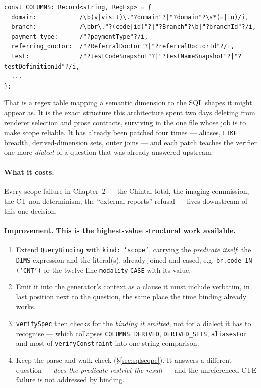 \documentclass[11pt,a4paper]{report}
\newcommand{\code}[1]{\texttt{\small #1}}
\begin{document}
\begin{lstlisting}
const COLUMNS: Record<string, RegExp> = {
  domain:            /\b(v|visit)\."?domain"?|"?domain"?\s*(=|in)/i,
  branch:            /\bbr\."?(code|id)"?|"?Branch"?\b|"?branchId"?/i,
  payment_type:      /"?paymentType"?/i,
  referring_doctor:  /"?ReferralDoctor"?|"?referralDoctorId"?/i,
  test:              /"?testCodeSnapshot"?|"?testNameSnapshot"?|"?testDefinitionId"?/i,
  ...
};
\end{lstlisting}

\noindent That is a regex table mapping a semantic dimension to the SQL shapes it might appear as.
It is the exact structure this architecture spent two days deleting from renderer selection and
prose contracts, surviving in the one file whose job is to make scope reliable. It has already been
patched four times --- aliases, \code{LIKE} breadth, derived-dimension sets, outer joins --- and
each patch teaches the verifier one more \emph{dialect} of a question that was already answered
upstream.

\paragraph{What it costs.} Every scope failure in Chapter~2 --- the Chintal total, the imaging
commission, the CT non-determinism, the ``external reports'' refusal --- lives downstream of this
one decision.

\paragraph{Improvement. This is the highest-value structural work available.}
\begin{enumerate}[leftmargin=*,itemsep=1pt]
\item Extend \code{QueryBinding} with \code{kind: 'scope'}, carrying the \emph{predicate itself}:
      the \code{DIMS} expression and the literal(s), already joined-and-cased, e.g.
      \code{br.code IN ('CNT')} or the twelve-line \code{modality} \code{CASE} with its value.
\item Emit it into the generator's context as a clause it must include verbatim, in last position
      next to the question, the same place the time binding already works.
\item \code{verifySpec} then checks for the \emph{binding it emitted}, not for a dialect it has to
      recognise --- which collapses \code{COLUMNS}, \code{DERIVED}, \code{DERIVED\_SETS},
      \code{aliasesFor} and most of \code{verifyConstraint} into one string comparison.
\item Keep the parse-and-walk check (\S\ref{sec:sqlscope}). It answers a different question ---
      \emph{does the predicate restrict the result} --- and the unreferenced-CTE failure is not
      addressed by binding.
\end{enumerate}
\end{document}
